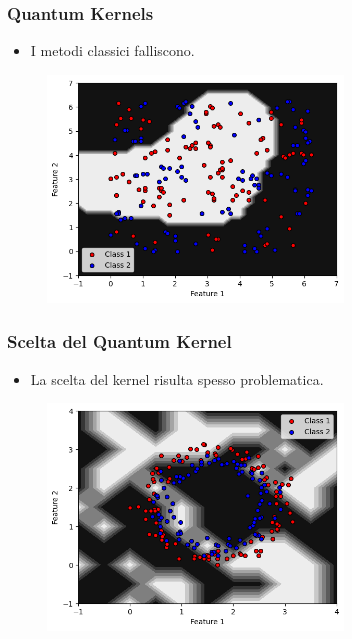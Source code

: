 \documentclass{beamer}
\begin{document}
\begin{frame}
  \frametitle{Quantum Kernels}
  \begin{itemize}
    \item I metodi classici falliscono.  
  \end{itemize}
        \begin{figure}
          \includegraphics[width=0.7\textwidth]{images/adhocrbf.png}
        \end{figure}
        
\end{frame}


\begin{frame}
  \frametitle{Scelta del Quantum Kernel}
  \begin{itemize}
    \item La scelta del kernel risulta spesso problematica. 
  \end{itemize}
        \begin{figure}
          \includegraphics[width=0.7\textwidth]{images/failcircle.png}
        \end{figure}
\end{frame}
\end{document}
